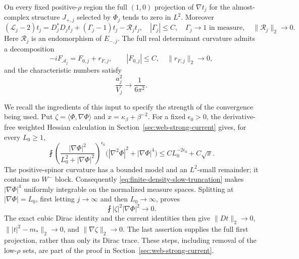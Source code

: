 \begin{lemma}
On every fixed positive-$\rho$ region the full $(1,0)$ projection
of $\nabla t_j$ for the almost-complex structure $J_{+,j}$ selected
by $\Phi_j$ tends to zero in $L^2$.  Moreover
\begin{equation}
 (\mathcal L_j-2)t_j
   =D_j^*D_jt_j+(\Gamma_j-1)t_j-\mathcal R_jt_j,
 \quad
 |\Gamma_j|\le C,\quad
 \Gamma_j\longrightarrow1 \text{ in measure},\quad
 \|\mathcal R_j\|_2\longrightarrow0.
 \label{eq:finite-density-torsion-equation}
\end{equation}
Here $\mathcal R_j$ is an endomorphism of $E_{-,j}$.  The full real
determinant curvature admits a decomposition
\begin{equation}
 -iF_{\mathcal A_j}=F_{0,j}+r_{F,j},\qquad
 |F_{0,j}|\le C,\quad \|r_{F,j}\|_2\longrightarrow0,
 \label{eq:finite-density-determinant-fit}
\end{equation}
and the characteristic numbers satisfy
\begin{equation}
 \frac{a_j^2}{V_j}\longrightarrow\frac1{6\pi^2}.
 \label{eq:finite-density-characteristic-limit}
\end{equation}
\end{lemma}

We recall the ingredients of this input to specify the strength of the
convergence being used.  Put $\zeta=\langle\Phi,\nabla\Phi\rangle$
and $x=\kappa_\beta+\beta^{-2}$.  For a fixed $\epsilon_0>0$, the
derivative-free weighted Hessian calculation in
Section~\ref{sec:web-strong-current} gives, for every $L_0\ge1$,
\begin{equation}
 \fint
 \left(\frac{|\nabla\Phi|^2}{L_0^2+|\nabla\Phi|^2}\right)^{\epsilon_0}
 \bigl(|\nabla^2\Phi|^2+|\nabla\Phi|^4\bigr)
 \le C L_0^{-2\epsilon_0}+C\sqrt{x}.
 \label{eq:finite-density-slow-truncation}
\end{equation}
The positive-spinor curvature has a bounded model and an $L^2$-small
remainder; it contains no $W^-$ block.  Consequently
\eqref{eq:finite-density-slow-truncation} makes
$|\nabla\Phi|^4$ uniformly integrable on the normalized measure
spaces.  Splitting at $|\nabla\Phi|=L_0$, first letting $j\to\infty$
and then $L_0\to\infty$, proves
\[
 \fint |\zeta|^2|\nabla\Phi|^2\longrightarrow0.
\]
The exact cubic Dirac identity and the current identities then give
$\|Dt\|_2\to0$, $\||t|^2-m_*\|_2\to0$, and
$\|\nabla\zeta\|_2\to0$.  The last assertion supplies the full
first projection, rather than only its Dirac trace.  These steps,
including removal of the low-$\rho$ sets, are part of the proof in
Section~\ref{sec:web-strong-current}.

